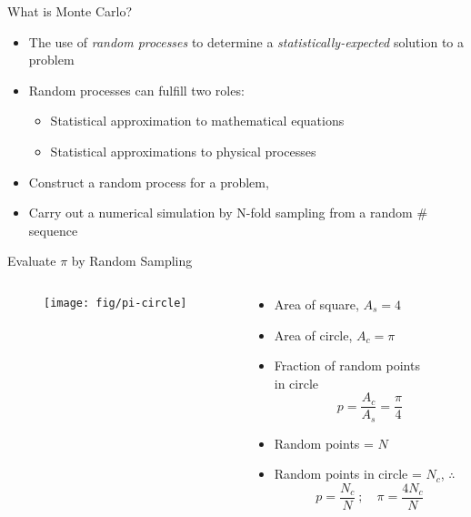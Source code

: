 \documentclass[xcolor=x11names,compress, handout]{beamer}
\renewcommand{\(}{\begin{columns}}
\renewcommand{\)}{\end{columns}}
\newcommand{\<}[1]{\begin{column}{#1}}
\renewcommand{\>}{\end{column}}
\begin{document}
\begin{frame}{What is Monte Carlo?}

  \begin{itemize}
  \item The use of \textit{random processes} to determine a 
        \textit{statistically-expected} solution to a problem
  \vspace*{1em}
  \item Random processes can fulfill two roles:
  \begin{itemize}
    \item Statistical approximation to \alert{mathematical equations}
    \item Statistical approximations to \alert{physical processes}
  \end{itemize}   
 \vspace*{1em} 
  \item Construct a random process for a problem, 
  \item Carry out a numerical simulation by N-fold sampling from a random \# sequence
\end{itemize}
\end{frame}

\begin{frame}{Evaluate $\pi$ by Random Sampling}

\begin{columns}
  \begin{column}{0.45\textwidth}
  	\begin{figure}
  	\begin{center}
  		\texttt{[image: fig/pi-circle]}
	\end{center}
  	\end{figure}
  \end{column}
  \begin{column}{0.55\textwidth}
    \begin{itemize}
    \item Area of square, $A_s= 4$
    \item Area of circle, $A_c = \pi$
    \item Fraction of random points \\in circle
    \[p = \frac{A_c}{A_s} = \frac{\pi}{4}\]
    \item Random points = $N$
    \item Random points in circle  = $N_c$, $\therefore$
    \[p = \frac{N_c}{N}\:; \quad \pi = \frac{4N_c}{N}\]
    \end{itemize}
  \end{column}
\end{columns}
\end{frame}
\end{document}
